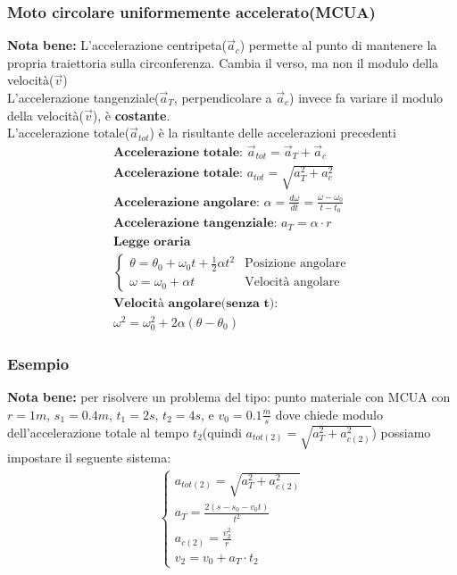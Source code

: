 \subsubsection{Moto circolare uniformemente accelerato(MCUA)}
\textbf{Nota bene: } L'accelerazione centripeta($\vec{a}_c$) permette al punto di mantenere la propria traiettoria sulla circonferenza. Cambia il verso, ma non il modulo della velocità($\vec{v}$) \\
L'accelerazione tangenziale($\vec{a}_T$, perpendicolare a $\vec{a}_c$) invece fa variare il modulo della velocità($\vec{v}$), è \textbf{costante}. \\
L'accelerazione totale($\vec{a}_{tot}$) è la risultante delle accelerazioni precedenti \\
\begin{gather*}
\textbf{Accelerazione totale: } \vec{a}_{tot} = \vec{a}_T + \vec{a}_c \\
\textbf{Accelerazione totale: } a_{tot} = \sqrt{a_T^2 + a_c^2} \\
\textbf{Accelerazione angolare: } \alpha = \frac{d \omega}{d t} = \frac{\omega - \omega_0}{t - t_0} \\
\textbf{Accelerazione tangenziale: } a_T = \alpha \cdot r \\
\textbf{Legge oraria} \\
\begin{cases}
    \theta = \theta_0 + \omega_0 t + \frac{1}{2} \alpha t^2 & \text{Posizione angolare} \\
    \omega = \omega_0 + \alpha t & \text{Velocità angolare}
\end{cases} \\
\textbf{Velocità angolare(senza t): } \\ \omega^2 = \omega_0^2 + 2 \alpha(\theta - \theta_0)
\end{gather*}
\subsubsection{Esempio}
\textbf{Nota bene: } per risolvere un problema del tipo: punto materiale con MCUA con $r = 1m$, $s_1 = 0.4m$, $t_1 = 2s$, $t_2 = 4s$, e $v_0 = 0.1 \frac{m}{s}$ dove chiede modulo dell'accelerazione totale al tempo $t_2$(quindi $a_{tot(2)} = \sqrt{a_T^2 + a_{c(2)}^2}$) possiamo impostare il seguente sistema:
\begin{gather*}
    \begin{cases}
        a_{tot(2)} = \sqrt{a_T^2 + a_{c(2)}^2} \\
        a_T = \frac{2(s - s_0 - v_0 t)}{t^2} \\
        a_{c(2)} = \frac{v_2^2}{r} \\ 
        v_{2} = v_0 + a_T \cdot t_2
    \end{cases}
\end{gather*}